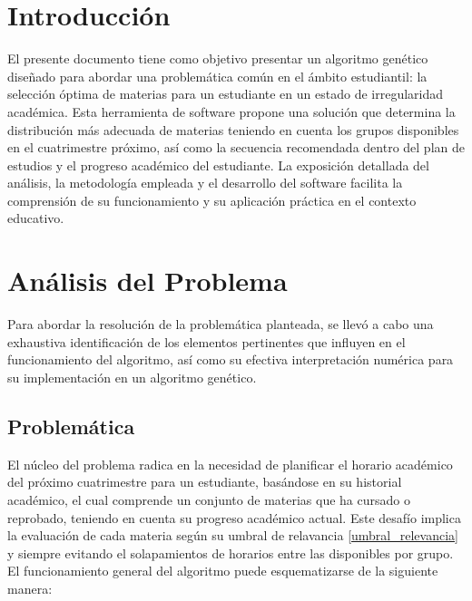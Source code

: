 
\begin{minipage}[c][\textheight][c]{\linewidth}

    \section{Introducción}
    El presente documento tiene como objetivo presentar un algoritmo genético diseñado para abordar una problemática común en el ámbito estudiantil: la selección óptima de materias para un estudiante en un estado de irregularidad académica. Esta herramienta de software propone una solución que determina la distribución más adecuada de materias teniendo en cuenta los grupos disponibles en el cuatrimestre próximo, así como la secuencia recomendada dentro del plan de estudios y el progreso académico del estudiante. La exposición detallada del análisis, la metodología empleada y el desarrollo del software facilita la comprensión de su funcionamiento y su aplicación práctica en el contexto educativo.

\end{minipage}

\newpage

\section{Análisis del Problema}
Para abordar la resolución de la problemática planteada, se llevó a cabo una exhaustiva identificación de los elementos pertinentes que influyen en el funcionamiento del algoritmo, así como su efectiva interpretación numérica para su implementación en un algoritmo genético.

\subsection{Problemática}
El núcleo del problema radica en la necesidad de planificar el horario académico del próximo cuatrimestre para un estudiante, basándose en su historial académico, el cual comprende un conjunto de materias que ha cursado o reprobado, teniendo en cuenta su progreso académico actual. Este desafío implica la evaluación de cada materia según su umbral de relavancia \ref{umbral_relevancia} y siempre evitando el solapamientos de horarios entre las disponibles por grupo. El funcionamiento general del algoritmo puede esquematizarse de la siguiente manera:

